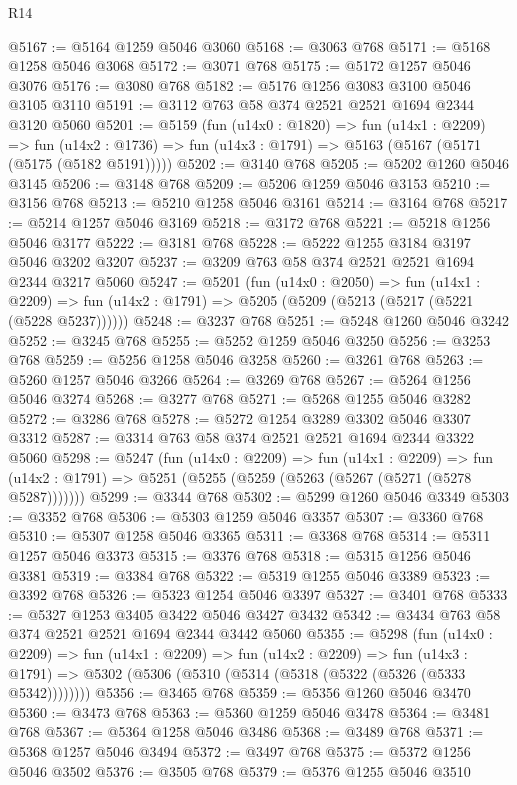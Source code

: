 \begin{lexlean}{R14}
\begin{coremodule}
@5167 := @5164 @1259 @5046 @3060
@5168 := @3063 @768
@5171 := @5168 @1258 @5046 @3068
@5172 := @3071 @768
@5175 := @5172 @1257 @5046 @3076
@5176 := @3080 @768
@5182 := @5176 @1256 @3083 @3100 @5046 @3105 @3110
@5191 := @3112 @763 @58 @374 @2521 @2521 @1694 @2344 @3120 @5060
@5201 := @5159
    (fun (u14x0 : @1820) =>
    fun (u14x1 : @2209) =>
    fun (u14x2 : @1736) => fun (u14x3 : @1791) => @5163 (@5167 (@5171 (@5175 (@5182 @5191)))))
@5202 := @3140 @768
@5205 := @5202 @1260 @5046 @3145
@5206 := @3148 @768
@5209 := @5206 @1259 @5046 @3153
@5210 := @3156 @768
@5213 := @5210 @1258 @5046 @3161
@5214 := @3164 @768
@5217 := @5214 @1257 @5046 @3169
@5218 := @3172 @768
@5221 := @5218 @1256 @5046 @3177
@5222 := @3181 @768
@5228 := @5222 @1255 @3184 @3197 @5046 @3202 @3207
@5237 := @3209 @763 @58 @374 @2521 @2521 @1694 @2344 @3217 @5060
@5247 := @5201
    (fun (u14x0 : @2050) =>
    fun (u14x1 : @2209) =>
    fun (u14x2 : @1791) => @5205 (@5209 (@5213 (@5217 (@5221 (@5228 @5237))))))
@5248 := @3237 @768
@5251 := @5248 @1260 @5046 @3242
@5252 := @3245 @768
@5255 := @5252 @1259 @5046 @3250
@5256 := @3253 @768
@5259 := @5256 @1258 @5046 @3258
@5260 := @3261 @768
@5263 := @5260 @1257 @5046 @3266
@5264 := @3269 @768
@5267 := @5264 @1256 @5046 @3274
@5268 := @3277 @768
@5271 := @5268 @1255 @5046 @3282
@5272 := @3286 @768
@5278 := @5272 @1254 @3289 @3302 @5046 @3307 @3312
@5287 := @3314 @763 @58 @374 @2521 @2521 @1694 @2344 @3322 @5060
@5298 := @5247
    (fun (u14x0 : @2209) =>
    fun (u14x1 : @2209) =>
    fun (u14x2 : @1791) => @5251 (@5255 (@5259 (@5263 (@5267 (@5271 (@5278 @5287)))))))
@5299 := @3344 @768
@5302 := @5299 @1260 @5046 @3349
@5303 := @3352 @768
@5306 := @5303 @1259 @5046 @3357
@5307 := @3360 @768
@5310 := @5307 @1258 @5046 @3365
@5311 := @3368 @768
@5314 := @5311 @1257 @5046 @3373
@5315 := @3376 @768
@5318 := @5315 @1256 @5046 @3381
@5319 := @3384 @768
@5322 := @5319 @1255 @5046 @3389
@5323 := @3392 @768
@5326 := @5323 @1254 @5046 @3397
@5327 := @3401 @768
@5333 := @5327 @1253 @3405 @3422 @5046 @3427 @3432
@5342 := @3434 @763 @58 @374 @2521 @2521 @1694 @2344 @3442 @5060
@5355 := @5298
    (fun (u14x0 : @2209) =>
    fun (u14x1 : @2209) =>
    fun (u14x2 : @2209) =>
    fun (u14x3 : @1791) => @5302 (@5306 (@5310 (@5314 (@5318 (@5322 (@5326 (@5333 @5342))))))))
@5356 := @3465 @768
@5359 := @5356 @1260 @5046 @3470
@5360 := @3473 @768
@5363 := @5360 @1259 @5046 @3478
@5364 := @3481 @768
@5367 := @5364 @1258 @5046 @3486
@5368 := @3489 @768
@5371 := @5368 @1257 @5046 @3494
@5372 := @3497 @768
@5375 := @5372 @1256 @5046 @3502
@5376 := @3505 @768
@5379 := @5376 @1255 @5046 @3510

\end{coremodule}
\end{lexlean}
